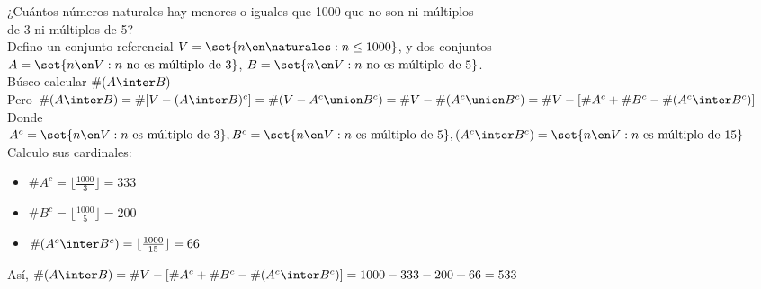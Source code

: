 \ejercicio

¿Cuántos números naturales hay menores o iguales que 1000 que no son ni múltiplos\\
de 3 ni múltiplos de 5?\\

Defino un conjunto referencial $V = \set{n \en \naturales : n \leq 1000}$, y dos conjuntos\\
$A = \set{n \en V : n \text{ no es múltiplo de } 3}$, $B = \set{n \en V : n \text{ no es múltiplo de } 5}$.\\

Búsco calcular $\#(A \inter B)$\\

Pero $
    \#(A \inter B) = \#[V - (A \inter B)^c] = \#(V - A^c \union B^c) = \#V - \#(A^c \union B^c) = \#V - [\#A^c + \#B^c - \#(A^c \inter B^c)]
$\\
Donde 
$
    A^c = \set{n \en V : n \text{ es múltiplo de } 3},
    B^c = \set{n \en V : n \text{ es múltiplo de } 5},\\
    (A^c \inter B^c) = \set{n \en V : n \text{ es múltiplo de } 15}
$\\

Calculo sus cardinales:

\begin{itemize}
    \item $\#A^c = \lfloor \frac{1000}{3} \rfloor = 333$
    \item $\#B^c = \lfloor \frac{1000}{5} \rfloor = 200$
    \item $\#(A^c \inter B^c) = \lfloor \frac{1000}{15} \rfloor = 66$
\end{itemize}

Así, $\#(A \inter B) = \#V - [\#A^c + \#B^c - \#(A^c \inter B^c)] = 1000 - 333 - 200 + 66 = 533$